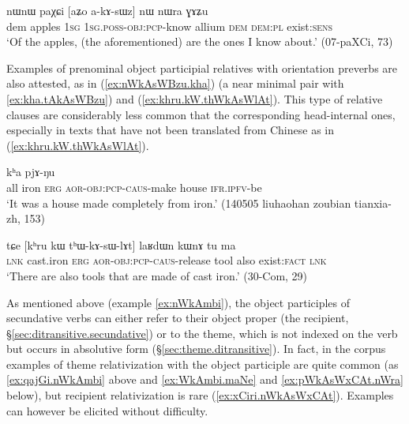 \begin{exe}
\ex \label{ex:paXCi.akAsWz}
\gll   nɯnɯ paχɕi [aʑo a-kɤ-sɯz] nɯ nɯra ɣɤʑu \\
dem apples \textsc{1sg} \textsc{1sg}.\textsc{poss}-\textsc{obj}:\textsc{pcp}-know allium \textsc{dem} \textsc{dem}:\textsc{pl} exist:\textsc{sens} \\
\glt `Of the apples, (the aforementioned) are the ones I know about.' (07-paXCi, 73)
\end{exe}  

Examples of prenominal object participial relatives with orientation preverbs are also attested, as in (\ref{ex:nWkAsWBzu.kha}) (a near minimal pair with \ref{ex:kha.tAkAsWBzu}) and (\ref{ex:khru.kW.thWkAsWlAt}). This type of relative clauses are considerably less common that the corresponding head-internal ones, especially in texts that have not been translated from Chinese as in (\ref{ex:khru.kW.thWkAsWlAt}).

\begin{exe}
\ex \label{ex:nWkAsWBzu.kha}
 kʰa pjɤ-ŋu \\
all iron \textsc{erg} \textsc{aor}-\textsc{obj}:\textsc{pcp}-\textsc{caus}-make house \textsc{ifr}.\textsc{ipfv}-be \\
\glt `It was a house made completely from iron.' (140505 liuhaohan zoubian tianxia-zh, 153)
\end{exe}


\begin{exe}
\ex \label{ex:khru.kW.thWkAsWlAt}
\gll tɕe [kʰru kɯ tʰɯ-kɤ-sɯ-lɤt] laʁdɯn kɯnɤ tu ma\\
\textsc{lnk} cast.iron \textsc{erg} \textsc{aor}-\textsc{obj}:\textsc{pcp}-\textsc{caus}-release tool also exist:\textsc{fact} \textsc{lnk}\\
\glt `There are also tools that are made of cast iron.' (30-Com, 29)
\end{exe}

As mentioned above (example \ref{ex:nWkAmbi}), the object participles of secundative verbs can either refer to their object proper (the recipient, §\ref{sec:ditransitive.secundative}) or to the theme, which is not indexed on the verb but occurs in absolutive form (§\ref{sec:theme.ditransitive}). In fact, in the corpus examples of theme relativization with the object participle are quite common (as \ref{ex:qajGi.nWkAmbi} above and \ref{ex:WkAmbi.maNe} and \ref{ex:pWkAsWxCAt.nWra} below), but recipient relativization is rare (\ref{ex:xCiri.nWkAsWxCAt}). Examples can however be elicited without difficulty.

